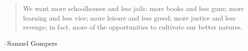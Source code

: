 \documentclass{exam}
\begin{document}
  \else
    \vspace{1 cm}
    \begin{quote}
      \begin{em}
        We want more schoolhouses and less jails; more books and less guns; more learning and less vice; more
        leisure and less greed; more justice and less revenge; in fact, more of the opportunities to cultivate our
        better natures.
      \end{em}
    \end{quote}
    \hspace{1 cm} --Samuel Gompers
  \fi
\end{document}
